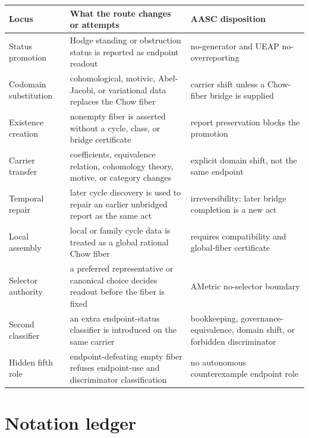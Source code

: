 \documentclass[11pt]{article}
\begin{document}
{\small
\begin{longtable}{p{}p{}p{}}
\toprule
Locus & What the route changes or attempts & AASC disposition\\
\midrule
\endhead
Status promotion & Hodge standing or obstruction status is reported as endpoint readout & no-generator and UEAP no-overreporting\\
Codomain substitution & cohomological, motivic, Abel-Jacobi, or variational data replaces the Chow fiber & carrier shift unless a Chow-fiber bridge is supplied\\
Existence creation & nonempty fiber is asserted without a cycle, class, or bridge certificate & report preservation blocks the promotion\\
Carrier transfer & coefficients, equivalence relation, cohomology theory, motive, or category changes & explicit domain shift, not the same endpoint\\
Temporal repair & later cycle discovery is used to repair an earlier unbridged report as the same act & irreversibility: later bridge completion is a new act\\
Local assembly & local or family cycle data is treated as a global rational Chow fiber & requires compatibility and global-fiber certificate\\
Selector authority & a preferred representative or canonical choice decides readout before the fiber is fixed & AMetric no-selector boundary\\
Second classifier & an extra endpoint-status classifier is introduced on the same carrier & bookkeeping, governance-equivalence, domain shift, or forbidden discriminator\\
Hidden fifth role & endpoint-defeating empty fiber refuses endpoint-use and discriminator classification & no autonomous counterexample endpoint role\\
\bottomrule
\end{longtable}
}

\section{Notation ledger}\label{app:notation}
\end{document}
